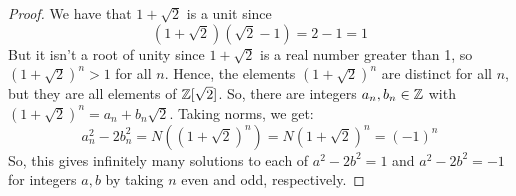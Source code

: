 \begin{proof}
    We have that $1 + \sqrt{2}$ is a unit since
    \[ (1+\sqrt{2})(\sqrt{2}-1) = 2-1 = 1 \]
    But it isn't a root of unity since $1+\sqrt{2}$ is a real number greater than 1, so $(1+\sqrt{2})^n > 1$ for all $n$. Hence, the elements $(1+\sqrt{2})^n$ are distinct for all $n$, but they are all elements of $\mathbb{Z}[\sqrt{2}]$. So, there are integers $a_n,b_n \in \mathbb{Z}$ with $(1+\sqrt{2})^n = a_n + b_n\sqrt{2}$. Taking norms, we get:
    \[ a_n^2-2b_n^2 = N((1+\sqrt{2})^n) = N(1+\sqrt{2})^n = (-1)^n \]
    So, this gives infinitely many solutions to each of $a^2-2b^2 = 1$ and $a^2-2b^2 = -1$ for integers $a,b$ by taking $n$ even and odd, respectively.
\end{proof}
